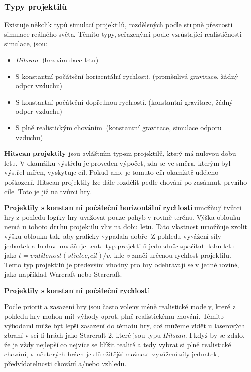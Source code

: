 \subsubsection{Typy projektilů}
Existuje několik typů simulací projektilů, rozdělených podle stupně přesnosti simulace reálného světa. Těmito typy, seřazenými podle vzrůstající realističnosti simulace, jsou:
\begin{itemize}
	\item \textit{Hitscan}. (bez simulace letu)
	\item S konstantní počáteční horizontální rychlostí. (proměnlivá gravitace, žádný odpor vzduchu)
	\item S konstantní počáteční dopřednou rychlostí. (konstantní gravitace, žádný odpor vzduchu)
	\item S plně realistickým chováním. (konstantní gravitace, simulace odporu vzduchu)
\end{itemize}

\textbf{Hitscan projektily} jsou zvláštním typem projektilů, který má nulovou dobu letu. V okamžiku výstřelu je proveden výpočet, zda se ve směru, kterým byl výstřel mířen, vyskytuje cíl. Pokud ano, je tomuto cíli okamžitě uděleno poškození. Hitscan projektily lze dále rozdělit podle chování po zasáhnutí prvního cíle. Toto je již na tvůrci hry.


\textbf{Projektily s konstantní počáteční horizontální rychlostí} umožňují tvůrci hry z pohledu logiky hry uvažovat pouze pohyb v rovině terénu. Výška oblouku nemá u tohoto druhu projektilu vliv na dobu letu. Tato vlastnost umožňuje zvolit výšku oblouku tak, aby graficky vypadala dobře. Z pohledu vyvážení síly jednotek a budov umožňuje tento typ projektilů jednoduše spočítat dobu letu jako \(t=vzdálenost(střelec, cíl) / v\), kde \textit{v} značí určenou rychlost projektilu. Tento typ projektilů je především vhodný pro hry odehrávají se v jedné rovině, jako například Warcraft nebo Starcraft.


\textbf{Projektily s konstantní počáteční rychlostí} 

Podle priorit a zasazení hry jsou často voleny méně realistické modely, které z pohledu hry mohou mít výhody oproti plně realistickému chování. Těmito výhodami může být lepší zasazení do tématu hry, což můžeme vidět u laserových zbraní v sci-fi hrách jako Starcraft 2\citep{site:starcraft}, které jsou typu \textit{Hitscan}. I když by se zdálo, že je vždy nejlepší co nejvíce se blížit realitě a tedy vybrat si plně realistické chování, v některých hrách je důležitější možnost vyvážení síly jednotek, předvídatelnosti chování a/nebo vzhledu.  
